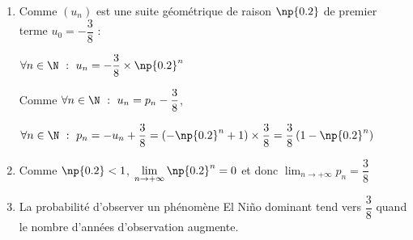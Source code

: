 \begin{enumerate}
\begin{enumerate}
Finalement quel que soit $n$ naturel, $u_{n+1} = \np{0.2}\times u_{n}$ : ceci prouve que $\left(u_n\right)$ est une suite géométrique de raison $\np{0.2}$.

			$u_0 = p_{0} - \dfrac{3}{8} = 0 - \dfrac{3}{8} = -\dfrac{3}{8}$

			Le premier terme est donné par : ${u_0 = - \dfrac{3}{8}}$

			\item Comme $\left(u_n\right)$ est une suite géométrique de raison $\np{0.2}$ de premier terme ${u_0 = - \dfrac{3}{8}}$ :

			$\forall n \in \N~:~u_n = - \dfrac{3}{8} \times \np{0.2}^{n} $

			Comme $\forall n \in \N~:~u_n = p_{n} - \dfrac{3}{8}$,

			$\forall n \in \N~:~p_n = -u_{n} + \dfrac{3}{8} = \left(-\np{0.2}^{n} +1 \right)\times \dfrac{3}{8} = \dfrac{3}{8}\left(1-\np{0.2}^{n}  \right)$
			
			\item
			Comme $\np{0.2}<1$, $\displaystyle\lim_{n\rightarrow +\infty}\np{0.2}^{n} = 0$ et donc $\displaystyle\lim_{n\rightarrow +\infty}p_{n} = \dfrac{3}{8}$
			\item La probabilité d'observer un phénomène El Niño dominant tend vers $\dfrac{3}{8}$ quand le nombre d'années d'observation augmente.
		\end{enumerate}	
\end{enumerate}

